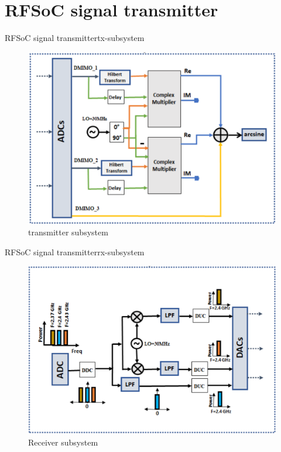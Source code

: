 \section{RFSoC signal transmitter}
\begin{frame}{RFSoC signal transmitter}{tx-subsystem}
	\begin{figure}
		\centering
		\includegraphics[scale=1]{graphics/tx_ss.png}
		\caption{transmitter subsystem}
	\end{figure}
\end{frame}
\begin{frame}{RFSoC signal transmitter}{rx-subsystem}
	\begin{figure}
		\centering
		\includegraphics[scale=1]{graphics/rx_ss.png}
		\caption{Receiver subsystem}
	\end{figure}
\end{frame}
